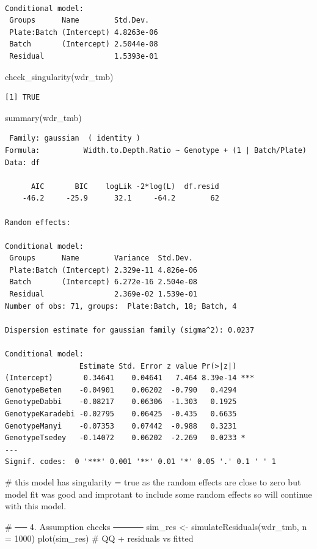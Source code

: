 \documentclass[
  letterpaper,
  DIV=11,
  numbers=noendperiod]{scrartcl}
\newenvironment{Shaded}{\begin{snugshade}}{\end{snugshade}}
\newcommand{\AttributeTok}[1]{\textcolor[rgb]{0.40,0.45,0.13}{#1}}
\newcommand{\CommentTok}[1]{\textcolor[rgb]{0.37,0.37,0.37}{#1}}
\newcommand{\DecValTok}[1]{\textcolor[rgb]{0.68,0.00,0.00}{#1}}
\newcommand{\FunctionTok}[1]{\textcolor[rgb]{0.28,0.35,0.67}{#1}}
\newcommand{\NormalTok}[1]{\textcolor[rgb]{0.00,0.23,0.31}{#1}}
\newcommand{\OtherTok}[1]{\textcolor[rgb]{0.00,0.23,0.31}{#1}}
\begin{document}
\begin{verbatim}

Conditional model:
 Groups      Name        Std.Dev.  
 Plate:Batch (Intercept) 4.8263e-06
 Batch       (Intercept) 2.5044e-08
 Residual                1.5393e-01
\end{verbatim}

\begin{Shaded}
\begin{Highlighting}[]
\FunctionTok{check\_singularity}\NormalTok{(wdr\_tmb)}
\end{Highlighting}
\end{Shaded}

\begin{verbatim}
[1] TRUE
\end{verbatim}

\begin{Shaded}
\begin{Highlighting}[]
\FunctionTok{summary}\NormalTok{(wdr\_tmb)}
\end{Highlighting}
\end{Shaded}

\begin{verbatim}
 Family: gaussian  ( identity )
Formula:          Width.to.Depth.Ratio ~ Genotype + (1 | Batch/Plate)
Data: df

      AIC       BIC    logLik -2*log(L)  df.resid 
    -46.2     -25.9      32.1     -64.2        62 

Random effects:

Conditional model:
 Groups      Name        Variance  Std.Dev. 
 Plate:Batch (Intercept) 2.329e-11 4.826e-06
 Batch       (Intercept) 6.272e-16 2.504e-08
 Residual                2.369e-02 1.539e-01
Number of obs: 71, groups:  Plate:Batch, 18; Batch, 4

Dispersion estimate for gaussian family (sigma^2): 0.0237 

Conditional model:
                 Estimate Std. Error z value Pr(>|z|)    
(Intercept)       0.34641    0.04641   7.464 8.39e-14 ***
GenotypeBeten    -0.04901    0.06202  -0.790   0.4294    
GenotypeDabbi    -0.08217    0.06306  -1.303   0.1925    
GenotypeKaradebi -0.02795    0.06425  -0.435   0.6635    
GenotypeManyi    -0.07353    0.07442  -0.988   0.3231    
GenotypeTsedey   -0.14072    0.06202  -2.269   0.0233 *  
---
Signif. codes:  0 '***' 0.001 '**' 0.01 '*' 0.05 '.' 0.1 ' ' 1
\end{verbatim}

\begin{Shaded}
\begin{Highlighting}[]
\CommentTok{\# this model has singularity = true as the random effects are  close to zero but model fit was good and improtant to include some random effects so will continue with this model.}

\CommentTok{\# ── 4. Assumption checks ─────}
\NormalTok{sim\_res }\OtherTok{\textless{}{-}} \FunctionTok{simulateResiduals}\NormalTok{(wdr\_tmb, }\AttributeTok{n =} \DecValTok{1000}\NormalTok{)}
\FunctionTok{plot}\NormalTok{(sim\_res)                               }\CommentTok{\# QQ + residuals vs fitted}
\end{Highlighting}
\end{Shaded}
\end{document}
